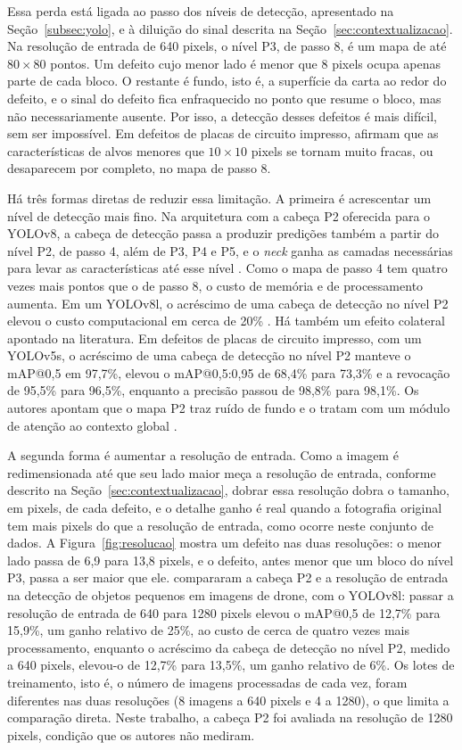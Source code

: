 \documentclass[
    12pt,                %
    openright,           %
    oneside,             %
    a4paper,             %
    english,             %
    brazil               %
]{abntex2}
\begin{document}
Essa perda está ligada ao passo dos níveis de detecção, apresentado na
Seção~\ref{subsec:yolo}, e à diluição do sinal descrita na
Seção~\ref{sec:contextualizacao}. Na resolução de entrada de 640 pixels, o nível
P3, de passo 8, é um mapa de até $80 \times 80$ pontos. Um defeito
cujo menor lado é menor que 8 pixels ocupa apenas parte de cada bloco.
O restante é fundo,
isto é, a superfície da carta ao redor do defeito, e o sinal do defeito
fica enfraquecido no ponto que resume o bloco, mas não necessariamente
ausente. Por isso, a detecção desses defeitos é mais
difícil, sem ser impossível. Em defeitos de placas de circuito impresso,
 afirmam que as características de alvos menores que
$10 \times 10$ pixels se tornam muito fracas, ou desaparecem por
completo, no mapa de passo 8.

Há três formas diretas de reduzir essa limitação. A primeira é
acrescentar um nível de detecção mais fino. Na arquitetura com a cabeça P2 oferecida para o YOLOv8, a
cabeça de detecção passa a produzir predições também a partir do nível P2, de passo 4,
além de P3, P4 e P5, e o \textit{neck} ganha as camadas necessárias para
levar as características até esse nível \cite{Jocher2023}. Como o mapa
de passo 4 tem quatro vezes mais pontos que o de passo 8, o custo de
memória e de processamento aumenta. Em um YOLOv8l, o acréscimo de uma cabeça de detecção no nível
P2 elevou o custo computacional em cerca de 20\% \cite{Liu2026}. Há
também um efeito colateral apontado na literatura. Em defeitos de placas
de circuito impresso, com um YOLOv5s, o acréscimo de uma cabeça de detecção no nível P2 manteve o
mAP@0,5 em 97,7\%, elevou o mAP@0,5:0,95 de 68,4\% para 73,3\% e a
revocação de 95,5\% para 96,5\%, enquanto a precisão passou de 98,8\%
para 98,1\%. Os autores apontam que o mapa P2 traz ruído de fundo e o
tratam com um módulo de atenção ao contexto global \cite{Xia2023}.

A segunda forma é aumentar a resolução de entrada. Como a imagem é
redimensionada até que seu lado maior meça a resolução de entrada,
conforme descrito na Seção~\ref{sec:contextualizacao}, dobrar essa
resolução dobra o tamanho, em pixels, de cada defeito, e o detalhe
ganho é real quando a fotografia original tem mais pixels do que a
resolução de entrada, como ocorre neste conjunto de dados. A
Figura~\ref{fig:resolucao} mostra um defeito nas duas resoluções: o menor lado passa de 6,9
para 13,8 pixels, e o defeito, antes menor que um bloco do nível P3,
passa a ser maior que ele.  compararam a cabeça P2 e a resolução de entrada
na detecção de objetos pequenos em imagens de drone, com o YOLOv8l:
passar a resolução de entrada de 640 para 1280 pixels elevou o mAP@0,5
de 12,7\% para 15,9\%, um ganho relativo de 25\%, ao custo de cerca de
quatro vezes mais processamento, enquanto o acréscimo da cabeça de detecção no nível P2,
medido a 640 pixels, elevou-o de 12,7\% para 13,5\%, um ganho relativo
de 6\%. Os lotes de treinamento, isto é, o número de imagens processadas
de cada vez, foram diferentes nas duas resoluções (8
imagens a 640 pixels e 4 a 1280), o que limita a comparação direta.
Neste trabalho, a cabeça P2 foi avaliada na resolução de 1280 pixels,
condição que os autores não mediram.
\end{document}
